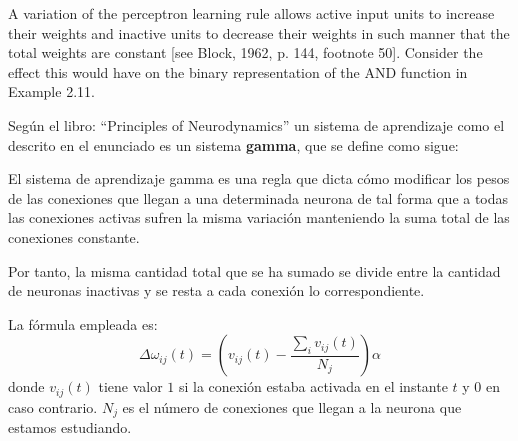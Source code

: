 \begin{problem}[14]
 A variation of the perceptron learning rule allows active input units to increase their
weights and inactive units to decrease their weights in such manner that the total
weights are constant [see Block, 1962, p. 144, footnote 50]. Consider the effect this
would have on the binary representation of the AND function in Example 2.11.

\solution

Según el libro: ``Principles of Neurodynamics'' un sistema de aprendizaje como el descrito en el enunciado es un sistema \textbf{gamma}, que se define como sigue:

\begin{defn}
El sistema de aprendizaje gamma es una regla que dicta cómo modificar los pesos de las conexiones que llegan a una determinada neurona de tal forma que a todas las conexiones activas sufren la misma variación manteniendo la suma total de las conexiones constante.

Por tanto, la misma cantidad total que se ha sumado se divide entre la cantidad de neuronas inactivas y se resta a cada conexión lo correspondiente.

La fórmula empleada es:
\[Δ ω_{ij}(t)=\left(v_{ij}(t)-\frac{\sum_i v_{ij}(t)}{N_j}\right)α\]
donde $v_{ij}(t)$ tiene valor $1$ si la conexión estaba activada en el instante $t$ y $0$ en caso contrario. $N_j$ es el número de conexiones que llegan a la neurona que estamos estudiando.
\end{defn}


\end{problem}
